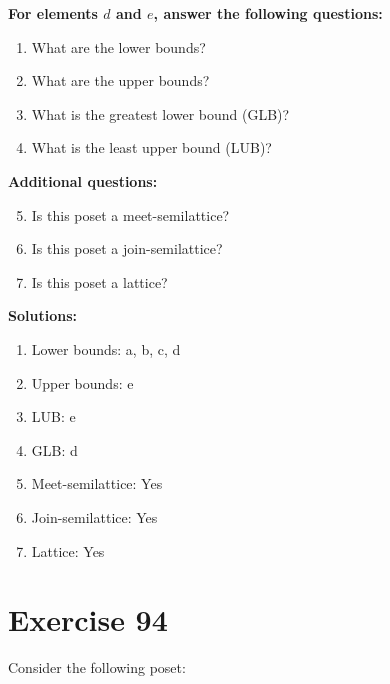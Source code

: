 \documentclass{article}
\begin{document}
    \textbf{For elements $d$ and $e$, answer the following questions:}
\begin{enumerate}
    \item What are the lower bounds?
    \item What are the upper bounds?
    \item What is the greatest lower bound (GLB)?
    \item What is the least upper bound (LUB)?
\end{enumerate}
    \hspace*{3ex} \textbf{Additional questions:}
\begin{enumerate}
    \setcounter{enumi}{4}
    \item Is this poset a meet-semilattice?
    \item Is this poset a join-semilattice?
    \item Is this poset a lattice?
\end{enumerate}

\textbf{Solutions:}
\begin{enumerate}
    \item Lower bounds: {a, b, c, d}
    \item Upper bounds: {e}
    \item LUB: e
    \item GLB: d
    \item Meet-semilattice: Yes
    \item Join-semilattice: Yes
    \item Lattice: Yes
\end{enumerate}
\newpage
\section*{Exercise 94}
Consider the following poset:
\begin{center}
\end{center}
\end{document}
